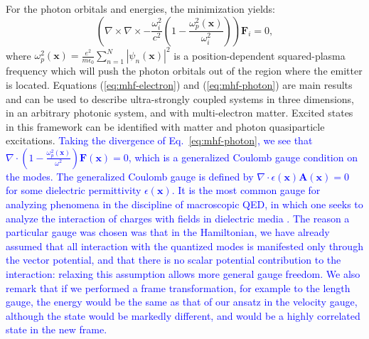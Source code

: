 \documentclass[aps,prl,twocolumn,
	groupedaddress,superscriptaddress,
	amsfonts,amssymb,amsmath,floatfix,
	citeautoscript]{revtex4-1}
\begin{document}
For the photon orbitals and energies, the minimization yields:
\begin{equation}
\left( \nabla\times\nabla\times - \frac{\omega_i^2}{c^2}\left(1-\frac{\omega_p^2(\mathbf{x})}{\omega_i^2} \right)\right)\mathbf{F}_i = 0,
\label{eq:mhf-photon}
\end{equation}
where $\omega_p^2(\mathbf{x}) = \frac{e^2}{m\epsilon_0}\sum\limits_{n=1}^N |\psi_n(\mathbf{x})|^2$ is a position-dependent squared-plasma frequency which will push the photon orbitals out of the region where the emitter is located. Equations (\ref{eq:mhf-electron}) and (\ref{eq:mhf-photon}) are main results and can be used to describe ultra-strongly coupled systems in three dimensions, in an arbitrary photonic system, and with multi-electron matter. Excited states in this framework can be identified with matter and photon quasiparticle excitations. \textcolor{blue}{Taking the divergence of {\color{red}Eq.~\ref{eq:mhf-photon}}, we see that $\nabla\cdot(1-\frac{\omega_p^2(\mathbf{x})}{\omega^2})\mathbf{F}(\mathbf{x})=0$, which is a generalized Coulomb gauge condition on the modes. The generalized Coulomb gauge is {\color{red}defined by} $\nabla\cdot\epsilon(\mathbf{x})\mathbf{A}(\mathbf{x})=0$ for some dielectric permittivity $\epsilon(\mathbf{x})${\color{red}. It is } the most common gauge for analyzing phenomena in the discipline of macroscopic QED, in which one seeks to analyze the interaction of charges with fields in dielectric media \cite{glauber1991quantum}. The reason a particular gauge was chosen was that in the Hamiltonian, we have already assumed that all interaction with the quantized modes is manifested only through the vector potential, and that there is no scalar potential contribution to the interaction: relaxing this assumption allows more general gauge freedom. We also remark that if we performed a frame transformation, for example to the length gauge, the energy would be the same as that of our ansatz in the velocity gauge, although the state would be markedly different, and would be a highly correlated state {\color{red}in the new frame}.}
\end{document}
